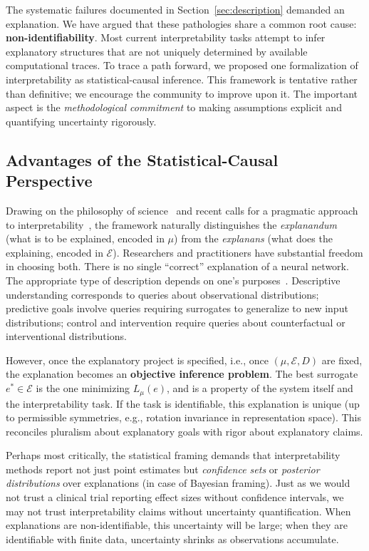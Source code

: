 The systematic failures documented in Section~\ref{sec:description} demanded an explanation. We have argued that these pathologies share a common root cause: \textbf{non-identifiability}. Most current interpretability tasks attempt to infer explanatory structures that are not uniquely determined by available computational traces.
% 
To trace a path forward, we proposed one formalization of interpretability as statistical-causal inference. This framework is tentative rather than definitive; we encourage the community to improve upon it. The important aspect is the \emph{methodological commitment} to making assumptions explicit and quantifying uncertainty rigorously.

\subsection{Advantages of the Statistical-Causal Perspective}
Drawing on the philosophy of science~\citep{chang2004inventing,Woodward2003-WOOMTH,potochnik2017idealization} and recent calls for a pragmatic approach to interpretability~\citep{davies2024cognitiverevolutioninterpretabilityexplaining,williams2025mechanisticinterpretabilityneedsphilosophy}, the framework naturally distinguishes the \emph{explanandum} (what is to be explained, encoded in $\mu$) from the \emph{explanans} (what does the explaining, encoded in $\mathcal{E}$). Researchers and practitioners have substantial freedom in choosing both. There is no single ``correct'' explanation of a neural network. The appropriate type of description depends on one's purposes~\citep{potochnik2017idealization}. Descriptive understanding corresponds to queries about observational distributions; predictive goals involve queries requiring surrogates to generalize to new input distributions; control and intervention require queries about counterfactual or interventional distributions.

However, once the explanatory project is specified, i.e., once $(\mu, \mathcal{E}, D)$ are fixed, the explanation becomes an \textbf{objective inference problem}. The best surrogate $e^* \in \mathcal{E}$ is the one minimizing $L_\mu(e)$, and is a property of the system itself and the interpretability task. If the task is identifiable, this explanation is unique (up to permissible symmetries, e.g., rotation invariance in representation space). This reconciles pluralism about explanatory goals with rigor about explanatory claims.

Perhaps most critically, the statistical framing demands that interpretability methods report not just point estimates but \emph{confidence sets} or \emph{posterior distributions} over explanations (in case of Bayesian framing). Just as we would not trust a clinical trial reporting effect sizes without confidence intervals, we may not trust interpretability claims without uncertainty quantification. When explanations are non-identifiable, this uncertainty will be large; when they are identifiable with finite data, uncertainty shrinks as observations accumulate. 

